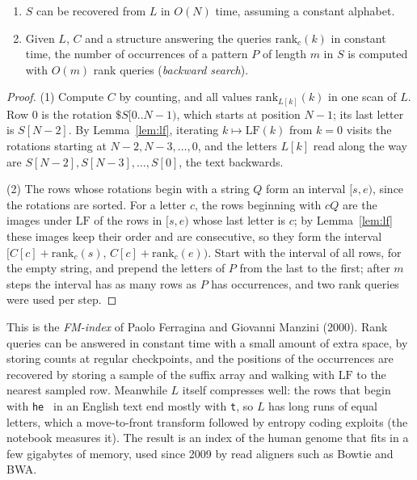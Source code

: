 \begin{theorem}\label{thm:bwtinvert}
\begin{enumerate}
\item $S$ can be recovered from $L$ in $O(N)$ time, assuming a constant alphabet.
\item Given $L$, $C$ and a structure answering the queries $\mathrm{rank}_c(k)$ in constant time, the number of occurrences of a pattern $P$ of length $m$ in $S$ is computed with $O(m)$ rank queries (\emph{backward search}).
\end{enumerate}
\end{theorem}
\begin{proof}
(1) Compute $C$ by counting, and all values $\mathrm{rank}_{L[k]}(k)$ in one scan of $L$. Row $0$ is the rotation $\$S[0..N-1)$, which starts at position $N-1$; its last letter is $S[N-2]$. By Lemma~\ref{lem:lf}, iterating $k\mapsto\mathrm{LF}(k)$ from $k=0$ visits the rotations starting at $N-2,N-3,\dots,0$, and the letters $L[k]$ read along the way are $S[N-2],S[N-3],\dots,S[0]$, the text backwards.

(2) The rows whose rotations begin with a string $Q$ form an interval $[s,e)$, since the rotations are sorted. For a letter $c$, the rows beginning with $cQ$ are the images under $\mathrm{LF}$ of the rows in $[s,e)$ whose last letter is $c$; by Lemma~\ref{lem:lf} these images keep their order and are consecutive, so they form the interval $[C[c]+\mathrm{rank}_c(s),\,C[c]+\mathrm{rank}_c(e))$.
Start with the interval of all rows, for the empty string, and prepend the letters of $P$ from the last to the first; after $m$ steps the interval has as many rows as $P$ has occurrences, and two rank queries were used per step.
\end{proof}

This is the \emph{FM-index} of Paolo Ferragina and Giovanni Manzini (2000). Rank queries can be answered in constant time with a small amount of extra space, by storing counts at regular checkpoints, and the positions of the occurrences are recovered by storing a sample of the suffix array and walking with $\mathrm{LF}$ to the nearest sampled row. Meanwhile $L$ itself compresses well: the rows that begin with \texttt{he~} in an English text end mostly with \texttt{t}, so $L$ has long runs of equal letters, which a move-to-front transform followed by entropy coding exploits (the notebook measures it). The result is an index of the human genome that fits in a few gigabytes of memory, used since 2009 by read aligners such as Bowtie and BWA.


